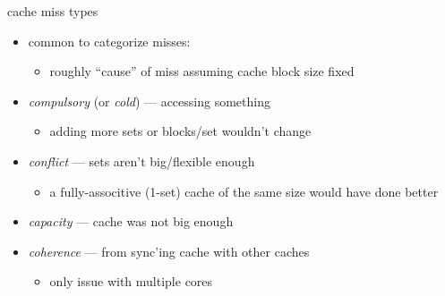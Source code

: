 \begin{frame}{cache miss types}
    \begin{itemize}
        \item common to categorize misses:
            \begin{itemize}
            \item roughly ``cause'' of miss assuming cache block size fixed
            \end{itemize}
        \vspace{.5cm}
        \item \textit{compulsory} (or \textit{cold}) ---  accessing something
            \begin{itemize}
            \item adding more sets or blocks/set wouldn't change
            \end{itemize}
        \item \textit{conflict} --- sets aren't big/flexible enough
            \begin{itemize}
            \item a fully-associtive (1-set) cache of the same size would have done better
            \end{itemize}
        \item \textit{capacity} --- cache was not big enough
        \item \textit{coherence} --- from sync'ing cache with other caches
            \begin{itemize}
            \item only issue with multiple cores
            \end{itemize}
    \end{itemize}
\end{frame}
